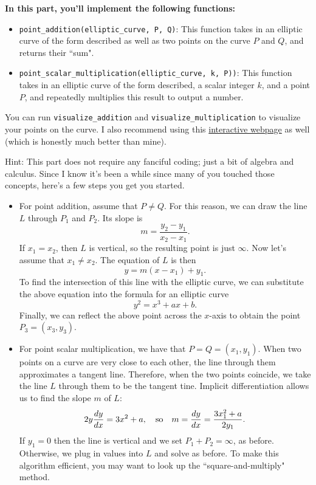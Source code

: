 \documentclass{article}
\begin{document}
\begin{tcolorbox}[enhanced,interior style={top color=Plum!20,bottom color=Plum!30}]
    \textbf{In this part, you'll implement the following functions:}
    \begin{itemize}
        \item \lstinline{point_addition(elliptic_curve, P, Q)}: This function takes in an elliptic curve of the form described as well as two points on the curve $P$ and $Q$, and returns their ``sum".
        \item \lstinline{point_scalar_multiplication(elliptic_curve, k, P))}: This function takes in an elliptic curve of the form described, a scalar integer $k$, and a point $P$, and repeatedly multiplies this result to output a number.
    \end{itemize}
    You can run \lstinline{visualize_addition} and \lstinline{visualize_multiplication} to visualize your points on the curve. I also recommend using this \href{https://andrea.corbellini.name/ecc/interactive/reals-add.html}{interactive webpage} as well (which is honestly much better than mine).

    \vspace{3mm}
    Hint: This part does not require any fanciful coding; just a bit of algebra and calculus. Since I know it's been a while since many of you touched those concepts, here's a few steps you get you started.
    \begin{itemize}
        \item For point addition, assume that $P \ne Q$. For this reason, we can draw the line $L$ through $P_{1}$ and $P_{2}$. Its slope is $$m = \frac{y_{2} - y_{1}}{x_{2} - x_{1}}.$$ If $x_{1} = x_{2}$, then $L$ is vertical, so the resulting point is just $\infty$. Now let's assume that $x_{1} \ne x_{2}$. The equation of $L$ is then $$y = m(x - x_{1}) + y_{1}.$$ To find the intersection of this line with the elliptic curve, we can substitute the above equation into the formula for an elliptic curve $$y^{2} = x^{3} + ax + b.$$ Finally, we can reflect the above point across the $x$-axis to obtain the point $P_{3} = (x_{3}, y_{3})$.
        \item For point scalar multiplication, we have that $P = Q = (x_{1}, y_{1})$. When two points on a curve are very close to each other, the line through them approximates a tangent line. Therefore, when the two points coincide, we take the line $L$ through them to be the tangent tine. Implicit differentiation allows us to find the slope $m$ of $L$: $$2y \frac{dy}{dx} = 3x^{2} + a,\text{\quad so\quad} m = \frac{dy}{dx} = \frac{3x_{1}^{2} + a}{2y_{1}}.$$ If $y_{1} = 0$ then the line is vertical and we set $P_{1} + P_{2} = \infty$, as before. Otherwise, we plug in values into $L$ and solve as before. To make this algorithm efficient, you may want to look up the ``square-and-multiply" method.
    \end{itemize}
    
\end{tcolorbox}
\end{document}
